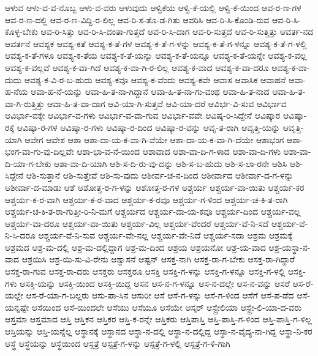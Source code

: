 {ಆಳುವ
ಆಳು-ವ-ವ-ನೊಬ್ಬ
ಆಳು-ವ-ವರು
ಆಳುವುದು
ಆಳ್ವಿಕೆಯ
ಆಳ್ವಿ-ಕೆ-ಯಲ್ಲಿ
ಆಳ್ವಿ-ಕೆ-ಯಿಂದ
ಆವ-ರ-ಣ-ಗಳ
ಆವ-ರ-ಣ-ದಲ್ಲಿ
ಆವ-ರ-ಣ-ವಿದ್ದಿ-ರ-ಲಿಲ್ಲ
ಆವ-ರಿ-ಸ-ತೊ-ಡ-ಗಿತು
ಆವರಿಸಿ
ಆವ-ರಿ-ಸಿ-ಕೊಂಡಿ-ರುವ
ಆವ-ರಿ-ಸಿ-ಕೊಳ್ಳ-ಬೇಕು
ಆವ-ರಿ-ಸಿತ್ತು
ಆವ-ರಿ-ಸಿ-ದಂತಾ-ಗುತ್ತದೆ
ಆವ-ರಿ-ಸಿ-ದಾಗ
ಆವ-ರಿ-ಸುತ್ತದೆ
ಆವ-ರಿ-ಸುತ್ತಿತ್ತು
ಆವರ್ತ-ನದ
ಆವರ್ತನೆ
ಆವಶ್ಯಕ
ಆವಶ್ಯ-ಕತೆ
ಆವಶ್ಯ-ಕ-ತೆ-ಗಳ
ಆವಶ್ಯ-ಕ-ತೆ-ಗ-ಳನ್ನು
ಆವಶ್ಯ-ಕ-ತೆ-ಗ-ಳನ್ನೂ
ಆವಶ್ಯ-ಕ-ತೆ-ಗ-ಳಲ್ಲಿ
ಆವಶ್ಯ-ಕ-ತೆ-ಗಳೂ
ಆವಶ್ಯ-ಕ-ತೆಯ
ಆವಶ್ಯ-ಕ-ತೆ-ಯನ್ನು
ಆವಶ್ಯ-ಕ-ತೆ-ಯನ್ನೂ
ಆವಶ್ಯ-ಕ-ತೆ-ಯನ್ನೇ
ಆವಶ್ಯ-ಕ-ವಲ್ಲ
ಆವಶ್ಯ-ಕ-ವಲ್ಲವೆ
ಆವಶ್ಯ-ಕ-ವಾ-ಗಿದೆ
ಆವಶ್ಯ-ಕ-ವಾ-ಗಿ-ರ-ಲಿಲ್ಲ
ಆವಶ್ಯ-ಕ-ವಾದ
ಆವಶ್ಯ-ಕ-ವಾ-ದರೂ
ಆವಶ್ಯ-ಕ-ವಾ-ದುದು
ಆವಶ್ಯ-ಕ-ವಿ-ರ-ಬ-ಹುದು
ಆವಶ್ಯ-ಕವೂ
ಆವಶ್ಯ-ಕ-ವೆಂದು
ಆವಶ್ಯ-ಕವೇ
ಆವಾಸ
ಆವಾಸಿಕ
ಆವಾಹನೆ
ಆವಾ-ಹ-ನೆಯ
ಆವಾ-ಹ-ನೆ-ಯನ್ನು
ಆವಾ-ಹಿ-ತ-ನಾ-ಗಿದ್ದಾನೆ
ಆವಾ-ಹಿ-ತ-ನಾ-ಗು-ವಂಥ
ಆವಾ-ಹಿ-ತ-ನಾದ
ಆವಾ-ಹಿ-ತ-ವಾ-ಗಿ-ರುತ್ತಿತ್ತು
ಆವಾ-ಹಿ-ತ-ವಾ-ದಾಗ
ಆವಿ-ಯಾ-ಗಿ-ಸುತ್ತವೆ
ಆವಿ-ಯಾ-ದರೆ
ಆವಿರ್ಭ-ವಿ-ಸುವ
ಆವಿರ್ಭಾವ
ಆವಿರ್ಭಾ-ವಕ್ಕೇ
ಆವಿರ್ಭಾ-ವ-ಗಳು
ಆವಿರ್ಭಾ-ವ-ವಾ-ಗುವ
ಆವಿರ್ಭಾ-ವವೇ
ಆವಿಷ್ಕ-ರಿ-ಸಿದ್ದೇನೆ
ಆವಿಷ್ಕಾರ
ಆವಿಷ್ಕಾ-ರಕ್ಕೆ
ಆವಿಷ್ಕಾ-ರ-ಗಳ
ಆವಿಷ್ಕಾ-ರ-ಗಳು
ಆವಿಷ್ಕಾ-ರ-ದಿಂದ
ಆವಿಷ್ಕಾ-ರ-ವನ್ನು
ಆವೃ-ತ-ರಾಗಿ
ಆವೃತ್ತಿ-ಯನ್ನು
ಆವೃತ್ತಿ-ಯಾಗಿ
ಆವೇಗ
ಆವೇಶ
ಆಶಾ
ಆಶಾ-ದಾ-ಯ-ಕ-ವಾ-ಗಿ-ವೆಯೇ
ಆಶಾ-ದಾ-ಯ-ಕ-ವಾ-ಗಿ-ದೆಯೇ
ಆಶಾಭಂಗ
ಆಶಾ-ಭಂಗ-ವಾ-ಗು-ವು-ದಿಲ್ಲವೇ
ಆಶಾ-ಭಾ-ವ-ನೆ-ಯಿಂದ
ಆಶಾವಾದ
ಆಶಾ-ವಾ-ದಿ-ಗ-ಳಾದ
ಆಶಾ-ವಾ-ದಿ-ಗಳು
ಆಶಾ-ವಾ-ದಿ-ಯಾ-ಗ-ಬೇಕು
ಆಶಾ-ವಾ-ದಿ-ಯಾಗಿ
ಆಶಿ-ಸ-ದಿ-ರು-ವು-ದನ್ನು
ಆಶಿ-ಸ-ಬ-ಹುದು
ಆಶಿ-ಸ-ಲಾ-ರನೇ
ಆಶಿಸಿ
ಆಶಿ-ಸಿದ್ದೇನೆ
ಆಶಿ-ಸುತ್ತಾನೆ
ಆಶಿ-ಸುತ್ತೇವೆ
ಆಶಿ-ಸು-ವುದು
ಆಶೀರ್ವ-ಚ-ನ-ದಿಂದ
ಆಶೀರ್ವಾದ
ಆಶೀರ್ವಾ-ದ-ಗ-ಳನ್ನು
ಆಶೀರ್ವಾ-ದ-ಮಾಡು
ಆಶೆ
ಆಶೋತ್ತ-ರ-ಗ-ಳನ್ನು
ಆಶೋತ್ತ-ರ-ಗಳ
ಆಶ್ಚರ್ಯ
ಆಶ್ಚರ್ಯ-ವಾ-ಯಿತು
ಆಶ್ಚರ್ಯ-ಕರ
ಆಶ್ಚರ್ಯ-ಕ-ರ-ವಾಗಿ
ಆಶ್ಚರ್ಯ-ಕ-ರ-ವಾದ
ಆಶ್ಚರ್ಯ-ಕ-ರವೂ
ಆಶ್ಚರ್ಯ-ಗ-ಳಿಂದ
ಆಶ್ಚರ್ಯ-ಚ-ಕಿ-ತ-ರಾಗಿ
ಆಶ್ಚರ್ಯ-ಚ-ಕಿ-ತ-ರಾ-ಗುತ್ತೀ-ರಿ-ನಿ-ಮಗೆ
ಆಶ್ಚರ್ಯದ
ಆಶ್ಚರ್ಯ-ದಾ-ಯ-ಕವೂ
ಆಶ್ಚರ್ಯ-ದಿಂದ
ಆಶ್ಚರ್ಯ-ವಲ್ಲ
ಆಶ್ಚರ್ಯ-ವಾ-ದರೂ
ಆಶ್ಚರ್ಯ-ವಾ-ಯಿತು
ಆಶ್ಚರ್ಯ-ವಿಲ್ಲ
ಆಶ್ಚರ್ಯ-ವೆಂದರೆ
ಆಶ್ಚರ್ಯ-ವೆ-ನಿ-ಸದೆ
ಆಶ್ಚರ್ಯ-ವೆ-ನಿ-ಸಿ-ದರೂ
ಆಶ್ಚರ್ಯ-ವೆ-ನಿ-ಸುವ
ಆಶ್ಚರ್ಯ-ವೇ-ನಲ್ಲ
ಆಶ್ಚರ್ಯ-ವೇ-ನಿದೆ
ಆಶ್ಚರ್ಯ-ಸದಾ
ಆಶ್ರಮ
ಆಶ್ರಮಕ್ಕೆ
ಆಶ್ರಮದ
ಆಶ್ರ-ಮ-ದಲ್ಲಿ
ಆಶ್ರ-ಮ-ದಲ್ಲಿದ್ದಾಗ
ಆಶ್ರ-ಮ-ದಿಂದ
ಆಶ್ರಯ
ಆಶ್ರಯನೋ
ಆಶ್ರ-ಯ-ವಾದ
ಆಶ್ರ-ಯಸ್ಥಾ-ನ-ವಾದ
ಆಶ್ರಯಿಸಿ
ಆಶ್ರ-ಯಿ-ಸು-ವಿ-ರೇನು
ಆಶ್ವಾಸನೆ
ಆಷ್ಟನ್
ಆಸಕ್ತ-ನಾಗಿ
ಆಸಕ್ತ-ರಾ-ಗ-ಬೇಕು
ಆಸಕ್ತ-ರಾ-ಗಿದ್ದಾರೆ
ಆಸಕ್ತ-ರಾ-ಗುವ
ಆಸಕ್ತ-ರಾ-ದರು
ಆಸಕ್ತರು
ಆಸಕ್ತರೂ
ಆಸಕ್ತಿ
ಆಸಕ್ತಿ-ಗ-ಳನ್ನು
ಆಸಕ್ತಿ-ಗ-ಳನ್ನೂ
ಆಸಕ್ತಿ-ಗ-ಳಲ್ಲಿ
ಆಸಕ್ತಿ-ಗಳು
ಆಸಕ್ತಿ-ಯನ್ನು
ಆಸಕ್ತಿ-ಯಿಂದ
ಆಸಕ್ತಿ-ಯಿದ್ದ
ಆಸನ
ಆಸ-ನ-ಗ-ಳನ್ನೂ
ಆಸ-ನ-ದಲ್ಲೇ
ಆಸ-ನ-ವನ್ನು
ಆಸರೆ
ಆಸ-ರೆ-ಯಲ್ಲೇ
ಆಸ-ರೆ-ಯಾ-ಗ-ಬಲ್ಲರು
ಆಸು-ಪಾ-ಸಿನ
ಆಸುರೀ
ಆಸೆ
ಆಸೆ-ಗ-ಳನ್ನು
ಆಸೆ-ಗ-ಳಿಂದ
ಆಸೆಗೆ
ಆಸೆ-ಪ-ಡೆದ
ಆಸೆ-ಯನ್ನಷ್ಟೇ
ಆಸೆಯಿಂದ
ಆಸೆ-ಯಿಂದಲೇ
ಆಸೆಯು
ಆಸೆಯೂ
ಆಸೆಯೇ
ಆಸ್ಕರ್
ಆಸ್ಟ್ರೇಲಿಯಾ
ಆಸ್ಟ್ರೇ-ಲಿ-ಯಾ-ದ-ವರು
ಆಸ್ತಮಾ
ಆಸ್ತಮಾದ
ಆಸ್ತಿ
ಆಸ್ತಿಕನ
ಆಸ್ತಿಕರ
ಆಸ್ತಿ-ಕ-ರನ್ನೇ
ಆಸ್ತಿಕರು
ಆಸ್ತಿಪಾಸ್ತಿ
ಆಸ್ತಿ-ಪಾಸ್ತಿ-ಗ-ಳಿಂದ
ಆಸ್ತಿ-ಪಾಸ್ತಿ-ಗ-ಳಿಲ್ಲ
ಆಸ್ತಿಯನ್ನು
ಆಸ್ತಿ-ಯನ್ನೆಲ್ಲ
ಆಸ್ಥಾನಕ್ಕೆ
ಆಸ್ಥಾನದ
ಆಸ್ಥಾ-ನ-ದಲ್ಲಿ
ಆಸ್ಥಾ-ನ-ದಲ್ಲಿದ್ದ
ಆಸ್ಥಾ-ನ-ವೈದ್ಯ-ನಾ-ಗಿದ್ದ
ಆಸ್ಥಾ-ನಿ-ಕರ
ಆಸ್ಥೆ
ಆಸ್ಥೆಯನ್ನು
ಆಸ್ಥೆಯಿಂದ
ಆಸ್ಪತ್ರೆ
ಆಸ್ಪತ್ರೆ-ಗ-ಳನ್ನು
ಆಸ್ಪತ್ರೆ-ಗ-ಳಲ್ಲಿ
ಆಸ್ಪತ್ರೆ-ಗ-ಳಿ-ಗಾಗಿ
}
